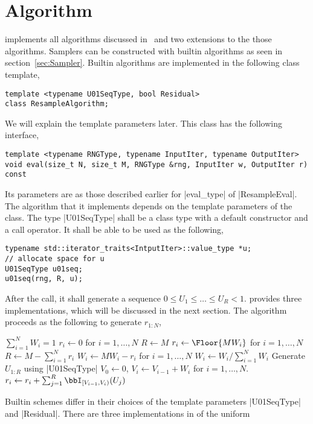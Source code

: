 \section{Algorithm}
\label{sec:Algorithm (Resample)}

\mckl implements all algorithms discussed in~\cite{Douc:2005wa} and two
extensions to the those algorithms. Samplers can be constructed with builtin
algorithms as seen in section~\ref{sec:Sampler}. Builtin algorithms are
implemented in the following class template,
\begin{verbatim}
template <typename U01SeqType, bool Residual>
class ResampleAlgorithm;
\end{verbatim}
We will explain the template parameters later. This class has the following
interface,
\begin{verbatim}
template <typename RNGType, typename InputIter, typename OutputIter>
void eval(size_t N, size_t M, RNGType &rng, InputIter w, OutputIter r) const
\end{verbatim}
Its parameters are as those described earlier for |eval_type| of
|ResampleEval|. The algorithm that it implements depends on the template
parameters of the class. The type |U01SeqType| shall be a class type with a
default constructor and a call operator. It shall be able to be used as the
following,
\begin{verbatim}
typename std::iterator_traits<IntputIter>::value_type *u;
// allocate space for u
U01SeqType u01seq;
u01seq(rng, R, u);
\end{verbatim}
After the call, it shall generate a sequence $0 \le U_1 \le \dots\le U_R < 1$.
\mckl provides three implementations, which will be discussed in the next
section. The algorithm proceeds as the following to generate $r_{1:N}$,
\halfskip
\begin{algorithmic}
  \REQUIRE $\sum_{i=1}^N W_i = 1$
  \STATE $r_i \leftarrow 0$ for $i = 1,\dots,N$
  \STATE $R \leftarrow M$
  \ELSE
  \STATE $r_i \leftarrow \Floor{MW_i}$ for $i = 1,\dots,N$
  \STATE $R \leftarrow M - \sum_{i=1}^N r_i$
  \STATE $W_i \leftarrow MW_i - r_i$ for $i = 1,\dots,N$
  \STATE $W_i \leftarrow W_i / \sum_{i=1}^NW_i$
  \ENDIF
  \STATE Generate $U_{1:R}$ using |U01SeqType|
  \STATE $V_0 \leftarrow 0$, $V_i \leftarrow V_{i - 1} + W_i$ for $i =
  1,\dots,N$.
  \STATE $r_i \leftarrow r_i + \sum_{j=1}^R\bbI_{[V_{i-1},V_i)}(U_j)$
\end{algorithmic}
\halfskip
Builtin schemes differ in their choices of the template parameters |U01SeqType|
and |Residual|. There are three implementations in \mckl of the uniform
